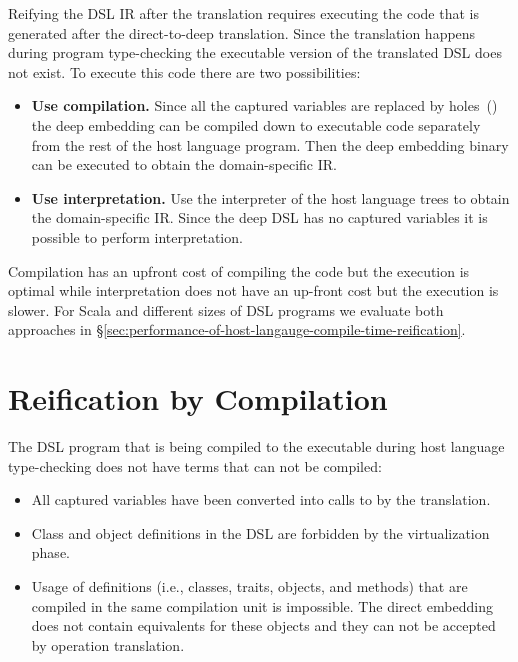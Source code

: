 Reifying the DSL IR after the translation requires executing the code that is generated
 after the direct-to-deep translation. Since the translation happens during program type-checking
 the executable version of the translated DSL does not exist. To execute this code there
 are two possibilities:\begin{itemize}
 \item {\bf Use compilation.} Since all the captured variables are replaced by holes~() the
  deep embedding can be compiled down to executable code separately from the rest of the host language program.
  Then the deep embedding binary can be executed to obtain the domain-specific IR.

 \item {\bf Use interpretation.} Use the interpreter of the host language trees to obtain the
  domain-specific IR. Since the deep DSL has no captured variables it is possible to
  perform interpretation.
 \end{itemize}

Compilation has an upfront cost of compiling the code but the execution is optimal while
 interpretation does not have an up-front cost but the execution is slower. For Scala
 and different sizes of DSL programs we evaluate both approaches in \S \ref{sec:performance-of-host-langauge-compile-time-reification}.

\section{Reification by Compilation}
\label{sec:reification-by-compilation}

The DSL program that is being compiled to the executable during host language type-checking
 does not have terms that can not be compiled:\begin{itemize}
  \item All captured variables have been converted into calls to  by the translation.
  \item Class and object definitions in the DSL are forbidden by the virtualization phase. 
  \item Usage of definitions (i.e., classes, traits, objects, and methods) that are compiled in the same compilation
   unit is impossible. The direct embedding does not contain equivalents for these objects and they can
   not be accepted by operation translation.
\end{itemize}

